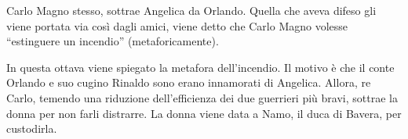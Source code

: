 \documentclass[a4paper]{article}
\newcommand{\quotes}[1]{``#1''}
\begin{document}
\begin{center} %
\begin{minipage}{0.5\textwidth}
\centering
{}
\end{minipage}
\end{center}

Carlo Magno stesso, sottrae Angelica da Orlando.
Quella che aveva difeso gli viene portata via così dagli amici,
viene detto che Carlo Magno volesse \quotes{estinguere un incendio} (metaforicamente).

\begin{center} %
\begin{minipage}{0.5\textwidth}
\centering
{}
\end{minipage}
\end{center}

In questa ottava viene spiegato la metafora dell'incendio.
Il motivo è che il conte Orlando e suo cugino Rinaldo sono erano
innamorati di Angelica.
Allora, re Carlo, temendo una riduzione dell'efficienza dei due guerrieri più bravi,
sottrae la donna per non farli distrarre.
La donna viene data a Namo, il duca di Bavera, per custodirla.
\end{document}
